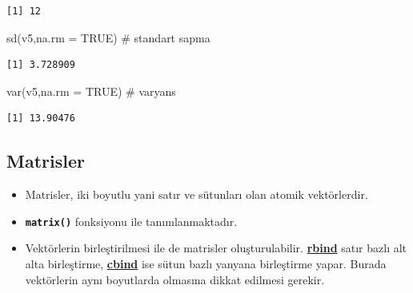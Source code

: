 \documentclass[
  letterpaper,
  DIV=11,
  numbers=noendperiod]{scrreprt}
\newenvironment{Shaded}{\begin{snugshade}}{\end{snugshade}}
\newcommand{\AttributeTok}[1]{\textcolor[rgb]{0.40,0.45,0.13}{#1}}
\newcommand{\CommentTok}[1]{\textcolor[rgb]{0.37,0.37,0.37}{#1}}
\newcommand{\ConstantTok}[1]{\textcolor[rgb]{0.56,0.35,0.01}{#1}}
\newcommand{\FunctionTok}[1]{\textcolor[rgb]{0.28,0.35,0.67}{#1}}
\newcommand{\NormalTok}[1]{\textcolor[rgb]{0.00,0.23,0.31}{#1}}
\begin{document}
\begin{verbatim}
[1] 12
\end{verbatim}

\begin{Shaded}
\begin{Highlighting}[]
\FunctionTok{sd}\NormalTok{(v5,}\AttributeTok{na.rm =} \ConstantTok{TRUE}\NormalTok{) }\CommentTok{\# standart sapma}
\end{Highlighting}
\end{Shaded}

\begin{verbatim}
[1] 3.728909
\end{verbatim}

\begin{Shaded}
\begin{Highlighting}[]
\FunctionTok{var}\NormalTok{(v5,}\AttributeTok{na.rm =} \ConstantTok{TRUE}\NormalTok{) }\CommentTok{\# varyans}
\end{Highlighting}
\end{Shaded}

\begin{verbatim}
[1] 13.90476
\end{verbatim}

\subsection{Matrisler}\label{matrisler}

\begin{itemize}
\item
  Matrisler, iki boyutlu yani satır ve sütunları olan atomik
  vektörlerdir.
\item
  \textbf{\texttt{matrix()}} fonksiyonu ile tanımlanmaktadır.
\item
  Vektörlerin birleştirilmesi ile de matrisler oluşturulabilir.
  \ul{\textbf{rbind}} satır bazlı alt alta birleştirme,
  \ul{\textbf{cbind}} ise sütun bazlı yanyana birleştirme yapar. Burada
  vektörlerin aynı boyutlarda olmasına dikkat edilmesi gerekir.
\end{itemize}
\end{document}
